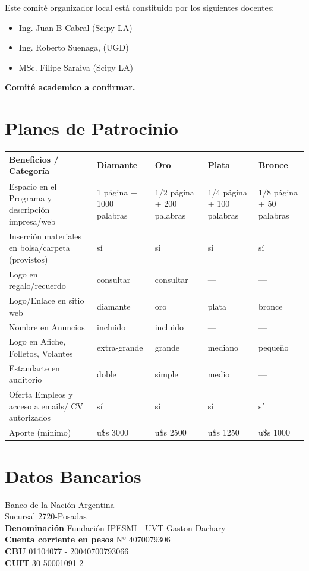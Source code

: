 \documentclass[11pt,a4paper]{report}
\begin{document}
Este comité organizador local está constituido por los siguientes docentes:\\
\begin{itemize}[nolistsep]
    \item Ing. Juan B Cabral (Scipy LA)
    \item Ing. Roberto Suenaga, (UGD)
    \item MSc. Filipe Saraiva (Scipy LA)
\end{itemize}

\textbf{Comité academico a confirmar.}

\section*{Planes de Patrocinio}
\begin{center}

\begin{tabular}{|p{4cm}|p{2.5cm}|p{2.5cm}|p{2.5cm}|p{2.5cm}|}
\hline
Beneficios / Categoría & Diamante & Oro  & Plata & Bronce \\
\hline
Espacio en el Programa y descripción impresa/web & 1 página +
1000 palabras & 1/2 página + 200 palabras & 1/4 página + 100 palabras &  1/8 página + 50 palabras\\
\hline
Inserción materiales en bolsa/carpeta (provistos) & sí & sí & sí & sí \\
\hline
Logo en regalo/recuerdo & consultar & consultar & --- & --- \\
\hline
Logo/Enlace en sitio web & diamante & oro & plata & bronce \\
\hline
Nombre en Anuncios & incluido & incluido & --- & --- \\
\hline
Logo en Afiche, Folletos, Volantes & extra-grande & grande & mediano & pequeño \\
\hline
Estandarte en auditorio & doble & simple & medio & --- \\
\hline
Oferta Empleos y acceso a emails/ CV autorizados  & sí & sí & sí & sí \\
\hline
Aporte (mínimo) & u\$s 3000 & u\$s 2500 & u\$s 1250 & u\$s 1000\\
\hline
\end{tabular}
\end{center}

\section*{Datos Bancarios}
\noindent Banco de la Nación Argentina \\
Sucursal 2720-Posadas \\
\textbf{Denominación} Fundación IPESMI - UVT Gaston Dachary \\
\textbf{Cuenta corriente en pesos} Nº 4070079306 \\
\textbf{CBU} 01104077 - 20040700793066 \\
\textbf{CUIT} 30-50001091-2 \\
\end{document}
